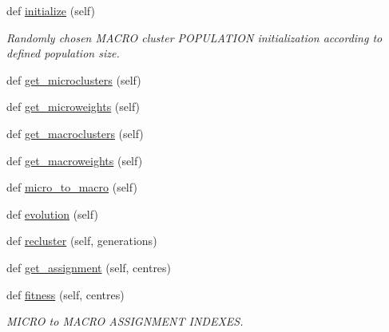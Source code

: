 \begin{DoxyCompactItemize}
def \hyperlink{classStreamClusteringAlgorithms_1_1evoStream_1_1v1_1_1Algorithm_1_1EvoStreamV1_1_1EvoStreamV1_af3acc41c758a42dac3d09c4d10812ac4}{initialize} (self)
\begin{DoxyCompactList}\small\item\em Randomly chosen M\+A\+C\+RO cluster P\+O\+P\+U\+L\+A\+T\+I\+ON initialization according to defined population size. \end{DoxyCompactList}\item 
def \hyperlink{classStreamClusteringAlgorithms_1_1evoStream_1_1v1_1_1Algorithm_1_1EvoStreamV1_1_1EvoStreamV1_aa5f1b3700b15e2d0d911ab14e6ebffed}{get\+\_\+microclusters} (self)
\item 
def \hyperlink{classStreamClusteringAlgorithms_1_1evoStream_1_1v1_1_1Algorithm_1_1EvoStreamV1_1_1EvoStreamV1_a7810a70a249a65ad701050e4b4bdeac9}{get\+\_\+microweights} (self)
\item 
def \hyperlink{classStreamClusteringAlgorithms_1_1evoStream_1_1v1_1_1Algorithm_1_1EvoStreamV1_1_1EvoStreamV1_acd743d25dfe419279d4745884223d464}{get\+\_\+macroclusters} (self)
\item 
def \hyperlink{classStreamClusteringAlgorithms_1_1evoStream_1_1v1_1_1Algorithm_1_1EvoStreamV1_1_1EvoStreamV1_ab99c359576c47f40cccdfa950c76ed40}{get\+\_\+macroweights} (self)
\item 
def \hyperlink{classStreamClusteringAlgorithms_1_1evoStream_1_1v1_1_1Algorithm_1_1EvoStreamV1_1_1EvoStreamV1_a649bb433a054250b3851a8a966fe8a7d}{micro\+\_\+to\+\_\+macro} (self)
\item 
def \hyperlink{classStreamClusteringAlgorithms_1_1evoStream_1_1v1_1_1Algorithm_1_1EvoStreamV1_1_1EvoStreamV1_a1e337e7c8fc00e3fdc4948e5e160e130}{evolution} (self)
\item 
def \hyperlink{classStreamClusteringAlgorithms_1_1evoStream_1_1v1_1_1Algorithm_1_1EvoStreamV1_1_1EvoStreamV1_a61fe2b70ac376c64a2da71cdd64626c2}{recluster} (self, generations)
\item 
def \hyperlink{classStreamClusteringAlgorithms_1_1evoStream_1_1v1_1_1Algorithm_1_1EvoStreamV1_1_1EvoStreamV1_ab24ec0dd2fbbf9b92e897897c5c976da}{get\+\_\+assignment} (self, centres)
\item 
def \hyperlink{classStreamClusteringAlgorithms_1_1evoStream_1_1v1_1_1Algorithm_1_1EvoStreamV1_1_1EvoStreamV1_aba0df9e50e35afaf30e6c21bcb245e3d}{fitness} (self, centres)
\begin{DoxyCompactList}\small\item\em M\+I\+C\+RO to M\+A\+C\+RO A\+S\+S\+I\+G\+N\+M\+E\+NT I\+N\+D\+E\+X\+ES. \end{DoxyCompactList}\item 

\end{DoxyCompactItemize}
